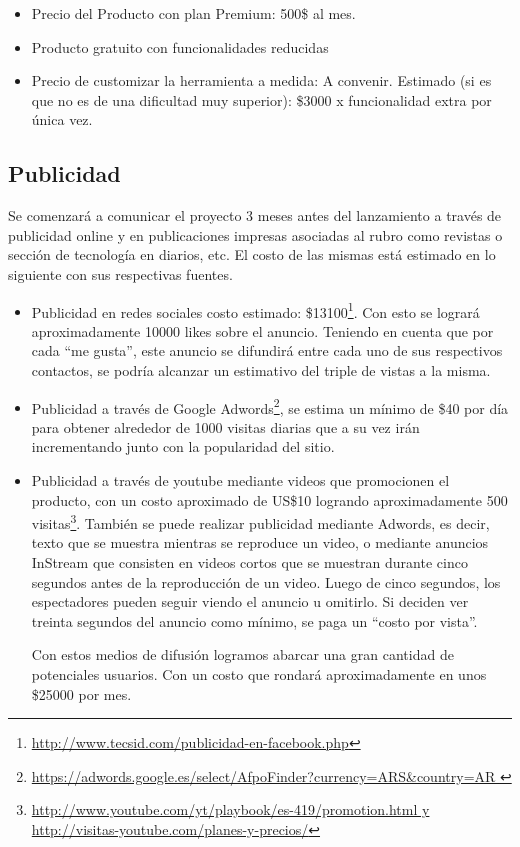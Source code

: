 \documentclass[oneside]{book}
\begin{document}
\begin{itemize}
	\item Precio del Producto con plan Premium: 500\$ al mes.

	\item Producto gratuito con funcionalidades reducidas
	\item Precio de customizar la herramienta a medida: A convenir.
Estimado (si es que no es de una dificultad muy superior): \$3000 x funcionalidad extra por \'{u}nica vez.
\end{itemize}






\subsection{Publicidad}
Se comenzará a comunicar el proyecto 3 meses antes del lanzamiento a través de publicidad  online y en publicaciones impresas asociadas al rubro como revistas o sección de tecnología en diarios, etc.
El costo de las mismas está estimado en lo siguiente con sus respectivas fuentes.\\

\begin{itemize}

	\item Publicidad en redes sociales costo estimado: \$13100\footnote{\url{http://www.tecsid.com/publicidad-en-facebook.php}}.
Con esto se lograr\'{a} aproximadamente 10000 likes sobre el anuncio. Teniendo en cuenta que por cada “me gusta”, este anuncio se difundirá entre cada uno de sus respectivos contactos, se podría alcanzar un estimativo del triple de vistas a la misma.

	\item Publicidad a través de Google Adwords\footnote{\url{https://adwords.google.es/select/AfpoFinder?currency=ARS&country=AR
}}, se estima un mínimo de \$40 por d\'{i}a para obtener alrededor de 1000 visitas diarias que a su vez ir\'{a}n incrementando junto con la popularidad del sitio.

	\item Publicidad a trav\'{e}s de youtube mediante videos que promocionen el producto, con un costo aproximado de US\$10 logrando aproximadamente 500 visitas\footnote{\url{http://www.youtube.com/yt/playbook/es-419/promotion.html y http://visitas-youtube.com/planes-y-precios/}}. Tambi\'{e}n se puede realizar publicidad mediante Adwords, es decir, texto que se muestra mientras se reproduce un video, o mediante anuncios InStream que consisten en videos cortos que se muestran durante cinco segundos antes de la reproducción de un video. Luego de cinco segundos, los espectadores pueden seguir viendo el anuncio u omitirlo. Si deciden ver treinta segundos del anuncio como m\'{i}nimo, se paga un “costo por vista”.


Con estos medios de difusión logramos abarcar una gran cantidad de potenciales usuarios. Con un costo que rondará aproximadamente en unos \$25000 por mes.

\end{itemize}
\end{document}
